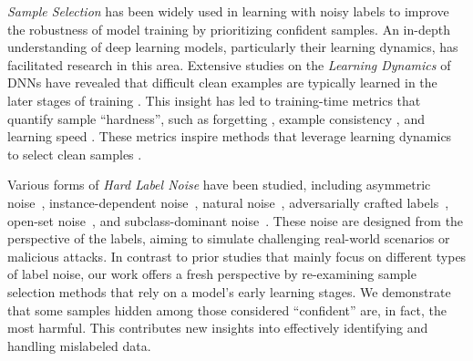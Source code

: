 \emph{Sample Selection} has been widely used in learning with noisy labels to improve the robustness of model training by prioritizing confident samples. An in-depth understanding of deep learning models, particularly their learning dynamics, has facilitated research in this area. Extensive studies on the \emph{Learning Dynamics} of DNNs have revealed that difficult clean examples are typically learned in the later stages of training \cite{arpit2017closer, toneva2018empirical, yuan2024early}. This insight has led to training-time metrics that quantify sample ``hardness'', such as forgetting \cite{toneva2018empirical}, example consistency \cite{pleiss2020identifying}, and learning speed \cite{jiang2021characterizing}. These metrics inspire methods that leverage learning dynamics to select clean samples \cite{zhou2021robust, maini2022characterizing}.

Various forms of \emph{Hard Label Noise} have been studied, including asymmetric noise~\citep{scott2013classification}, instance-dependent noise~\citep{xia2020part}, natural noise~\citep{wei2021learning}, adversarially crafted labels~\citep{zhang2024badlabel}, open-set noise~\citep{wei2021open}, and subclass-dominant noise~\cite{bai2023subclassdominant}. These noise are designed from the perspective of the labels, aiming to simulate challenging real-world scenarios or malicious attacks. 
In contrast to prior studies that mainly focus on different types of label noise, our work offers a fresh perspective by re-examining sample selection methods that rely on a model's early learning stages. We demonstrate that some samples hidden among those considered ``confident'' are, in fact, the most harmful. This contributes new insights into effectively identifying and handling mislabeled data.